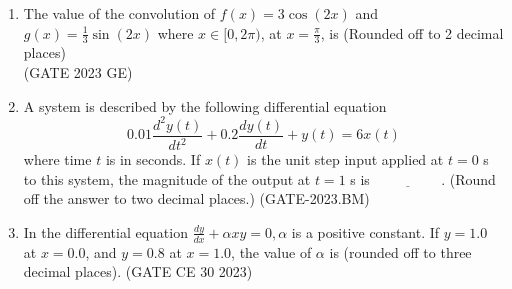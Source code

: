 \begin{enumerate}[label=\thechapter.\arabic*,ref=\thechapter.\theenumi]
\solution

\newpage
\item The value of the convolution of $f(x) = 3\cos(2x)$ and $g(x) = \frac{1}{3}\sin(2x)$ where $x \in [0, 2\pi)$, at $x = \frac{\pi}{3}$, is (Rounded off to 2 decimal places)\\
\hfill (GATE 2023 GE)\\
\solution
\pagebreak
\item A system is described by the following differential equation
    \[
    0.01 \frac{d^2y(t)}{dt^2} + 0.2\frac{dy(t)}{dt} + y(t) = 6x(t)
    \]
    where time \( t \) is in seconds. If \( x(t) \) is the unit step input applied at \( t = 0 \) s to this system, the magnitude of the output at \( t = 1 \) s is \(\underline{\hspace{2cm}}\). (Round off the answer to two decimal places.)
    \hfill (GATE-2023.BM)\\
    \solution
    
    \pagebreak

\item In the differential equation $\frac{dy}{dx} + \alpha x y = 0, \alpha$ is a positive constant. If $y = 1.0$ at
$x = 0.0$, and $y = 0.8$ at $x = 1.0$, the value of $\alpha$ is (rounded off to three decimal places).  \hfill(GATE CE 30 2023)\\
\solution

\pagebreak

\end{enumerate}
